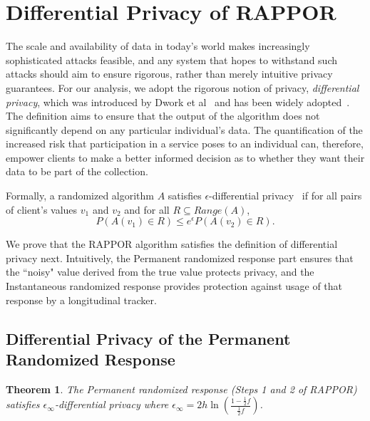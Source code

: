 \documentclass{sig-alternate-2013}
\newtheorem{theorem}{Theorem}
\newcommand\RAPPOR{{RAPPOR}}
\begin{document}
\section{Differential Privacy of \RAPPOR{}}\label{sec:diffprivacy}
The scale and availability of data in today's world makes increasingly sophisticated attacks feasible, and any system that hopes to withstand such attacks should aim to ensure rigorous, rather than merely intuitive privacy guarantees. For our analysis, we adopt the rigorous notion of privacy, \textit{differential privacy}, which was introduced by Dwork et al~\citep{dwork06} and has been widely adopted~\cite{DworkCACM}. The definition aims to ensure that the output of the algorithm does not significantly depend on any particular individual's data. The quantification of the increased risk that participation in a service poses to an individual can, therefore, empower clients to make a better informed decision as to whether they want their data to be part of the collection.

Formally, a randomized algorithm $A$ satisfies $\epsilon$-differential privacy~\citep{dwork06} if for all pairs of client's values $v_1$ and $v_2$ and for all $R\subseteq Range(A)$,
$$
P(A(v_1) \in R) \le e^\epsilon P(A(v_2) \in R).
$$


We prove that the \RAPPOR{} algorithm satisfies the definition of differential privacy next. 
Intuitively, the Permanent randomized response part ensures that the ``noisy" value derived from the true value protects privacy, and the Instantaneous randomized response provides protection against usage of that response by a longitudinal tracker.









\subsection{Differential Privacy of the Permanent Randomized Response}
\begin{theorem}\label{thm-one}
The Permanent randomized response (Steps 1 and 2 of \RAPPOR{}) satisfies $\epsilon_{\infty}$-differential privacy where $\epsilon_{\infty} = 2h\ln\left(\frac{1 - \frac{1}{2}f}{\frac{1}{2}f}\right)$.
\end{theorem}
\end{document}
